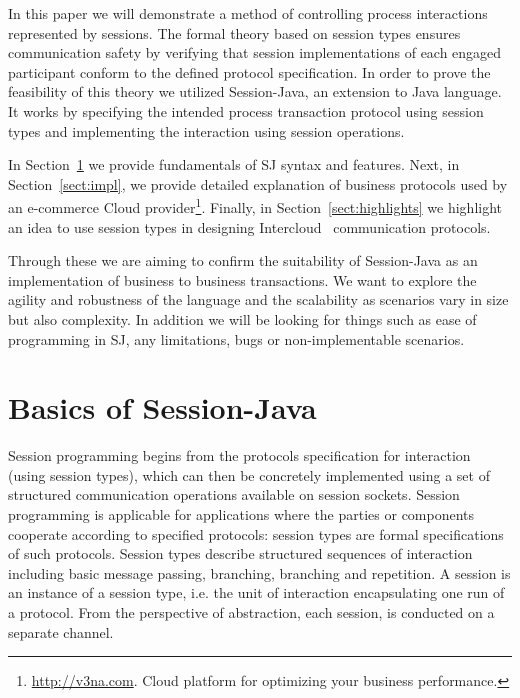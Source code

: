 \documentclass{llncs}
\begin{document}
In this paper we will demonstrate a method of controlling process interactions represented by sessions. The formal theory based on session types ensures communication safety by verifying that session implementations of each engaged participant conform to the defined protocol specification. In order to prove the feasibility of this theory we utilized Session-Java, an extension to Java language. It works by specifying the intended process transaction protocol using session types and implementing the interaction using session operations.

In Section~\ref{sect:basics} we provide fundamentals of SJ syntax and features.
Next, in Section~\ref{sect:impl}, we provide detailed explanation of business protocols used by an e-commerce Cloud provider\footnote{\url{http://v3na.com}. Cloud platform for optimizing your business performance.}. %
Finally, in Section~\ref{sect:highlights} we highlight an idea to use session types in designing Intercloud~\cite{intercloud} communication protocols.

Through these we are aiming to confirm the suitability of Session-Java as an implementation of business to business transactions. We want to explore the agility and robustness of the language and the scalability as scenarios vary in size but also complexity. In addition we will be looking for things such as ease of programming in SJ, any limitations, bugs or non-implementable scenarios.

\section{Basics of Session-Java}
\label{sect:basics}

Session programming begins from the protocols specification for interaction (using session types), which can then be concretely implemented using a set of structured communication operations available on session sockets. Session programming is applicable for applications where the parties or components cooperate according to specified protocols: session types are formal specifications of such protocols. Session types describe structured sequences of interaction including basic message passing, branching, branching and repetition. A session is an instance of a session type, i.e. the unit of interaction encapsulating one run of a protocol. From the perspective of abstraction, each session, is conducted on a separate channel. 
\end{document}
